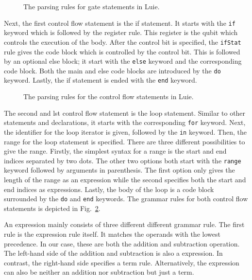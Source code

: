 \begin{figure}[]
    \centering
    
    \caption{The parsing rules for gate statements in Luie.}
    \label{fig:implementation_grammarGateStatements}
\end{figure}

Next, the first control flow statement is the if statement. It starts with the \texttt{if} keyword which is followed by the register rule. This register is the qubit which controls the execution of the body. After the control bit is specified, the \texttt{ifStat} rule gives the code block which is controlled by the control bit. This is followed by an optional else block; it start with the \texttt{else} keyword and the corresponding code block. Both the main and else code blocks are introduced by the \texttt{do} keyword. Lastly, the if statement is ended with the \texttt{end} keyword.

\begin{figure}[b]
    \centering
    
    \caption{The parsing rules for the control flow statements in Luie.}
    \label{fig:implementation_controlFlowStatements}
\end{figure}

The second and lst control flow statement is the loop statement. Similar to other statements and declarations, it starts with the corresponding \texttt{for} keyword. Next, the identifier for the loop iterator is given, followed by the \texttt{in} keyword. Then, the range for the loop statement is specified. There are three different possibilities to give the range. Firstly, the simplest syntax for a range is the start and end indices separated by two dots. The other two options both start with the \texttt{range} keyword followed by arguments in parenthesis. The first option only gives the length of the range as an expression while the second specifies both the start and end indices as expressions. Lastly, the body of the loop is a code block surrounded by the \texttt{do} and \texttt{end} keywords.   
The grammar rules for both control flow statements is depicted in Fig.~\ref{fig:implementation_controlFlowStatements}.

An expression mainly consists of three different different grammar rule. The first rule is the expression rule itself. It matches the operands with the lowest precedence. In our case, these are both the addition and subtraction operation. The left-hand side of the addition and subtraction is also a expression. In contrast, the right-hand side specifies a term rule. Alternatively, the expression can also be neither an addition nor subtraction but just a term. 


